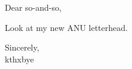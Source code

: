 \documentclass{article}
\begin{document}
\noindent
Dear so-and-so,

\bigskip

Look at my new ANU letterhead.

\bigskip

\noindent
Sincerely,\\
kthxbye
\end{document}
